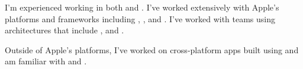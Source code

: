 %
I'm experienced working in both  and .
%
I've worked extensively with Apple's platforms and frameworks including
, ,  and .
%
I've worked with teams using architectures that include ,
 and .

\smallskip

Outside of Apple's platforms, I've worked on cross-platform apps built using
 and am familiar with  and .

\bigskip

